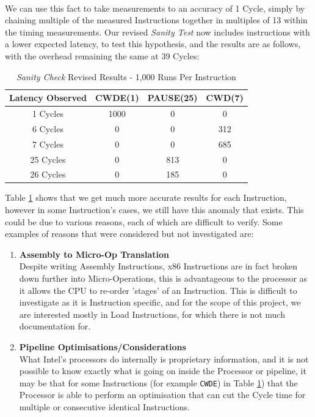\documentclass[bsc,frontabs,twoside,singlespacing,parskip,deptreport]{infthesis}     %
\begin{document}
\\
We can use this fact to take measurements to an accuracy of 1 Cycle, simply by chaining multiple of the measured Instructions together in multiples of 13 within the timing measurements. Our revised \textit{Sanity Test} now includes instructions with a lower expected latency, to test this hypothesis, and the results are as follows, with the overhead remaining the same at 39 Cycles:

\begin{table}[!h]
\begin{center}
\caption{\textit{Sanity Check} Revised Results - 1,000 Runs Per Instruction}
\label{fig:sanity-results-2}
\begin{tabular}{ |c||c|c|c| } 
    \hline
    Latency Observed & CWDE(1) & PAUSE(25) & CWD(7) \\
    \hline
    1 Cycles   & 1000 & 0   & 0   \\
    6 Cycles   & 0    & 0   & 312 \\
    7 Cycles   & 0    & 0   & 685 \\
    25 Cycles  & 0    & 813 & 0 \\
    26 Cycles  & 0    & 185 & 0   \\
    \hline
\end{tabular}
\end{center}
\end{table}

Table \ref{fig:sanity-results-2} shows that we get much more accurate results for each Instruction, however in some Instruction's cases, we still have this anomaly that exists. This could be due to various reasons, each of which are difficult to verify. Some examples of reasons that were considered but not investigated are:

\begin{enumerate}
    \item{{\bf Assembly to Micro-Op Translation} \\
        Despite writing Assembly Instructions, x86 Instructions are in fact broken down further into Micro-Operations, this is advantageous to the processor as it allows the CPU to re-order 'stages' of an Instruction. This is difficult to investigate as it is Instruction specific, and for the scope of this project, we are interested mostly in Load Instructions, for which there is not much documentation for.
    }
    \item{{\bf Pipeline Optimisations/Considerations} \\
        What Intel's processors do internally is proprietary information, and it is not possible to know exactly what is going on inside the Processor or pipeline, it may be that for some Instructions (for example \texttt{CWDE}) in Table \ref{fig:sanity-results-2}) that the Processor is able to perform an optimisation that can cut the Cycle time for multiple or consecutive identical Instructions.
    }
\end{enumerate}
\end{document}
